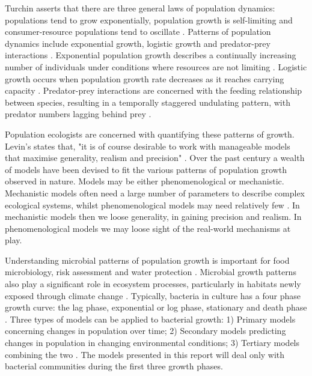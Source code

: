 \documentclass[titlepage]{article}
\begin{document}
\indent Turchin asserts that there are three general laws of population dynamics: populations tend to grow exponentially, population growth is self-limiting and consumer-resource populations tend to oscillate \cite{TurchinPeter2001Dpeh}. Patterns of population dynamics include exponential growth, logistic growth and predator-prey interactions \cite{RockwoodLarryL.2015ItPE}. Exponential population growth describes a continually increasing number of individuals under conditions where resources are not limiting \cite{BotsfordLouisW.author2019Pdfc}. Logistic growth occurs when population growth rate decreases as it reaches carrying capacity \cite{KingslandSharon1982TRMT}. Predator-prey interactions are concerned with the feeding relationship between species, resulting in a temporally staggered undulating pattern, with predator numbers lagging behind prey \cite{BerrymanAlanA.AlanAndrew1937-2008Ps:a}.  \

\indent  Population ecologists are concerned with quantifying these patterns of growth. Levin's states that, "it is of course desirable to work with manageable models that maximise generality, realism and precision" \cite{levins1966strategy}. Over the past century a wealth of models have been devised to fit the various patterns of population growth observed in nature. Models may be either phenomenological or mechanistic. Mechanistic models often need a large number of parameters to describe complex ecological systems, whilst phenomenological models may need relatively few \cite{transtrum2016bridging}. In mechanistic models then we loose generality, in gaining precision and realism. In phenomenological models we may loose sight of the real-world mechanisms at play.\

\indent Understanding microbial patterns of population growth is important for food microbiology, risk assessment and water protection \cite{zwietering1990modeling} \cite{nauta2002modelling} \cite{dukan1996dynamic}. Microbial growth patterns also play a significant role in ecosystem processes, particularly in habitats newly exposed through climate change \cite{bradley2017microbial}. Typically, bacteria in culture has a four phase growth curve: the lag phase, exponential or log phase, stationary and death phase \cite{al2008studying}. Three types of models can be applied to bacterial growth: 1) Primary models concerning changes in population over time; 2) Secondary models predicting changes in population in changing environmental conditions; 3) Tertiary models combining the two \cite{whiting1995microbial}\cite{grijspeerdt1999estimating}. The models presented in this report will deal only with bacterial communities during the first three growth phases. \
\end{document}
